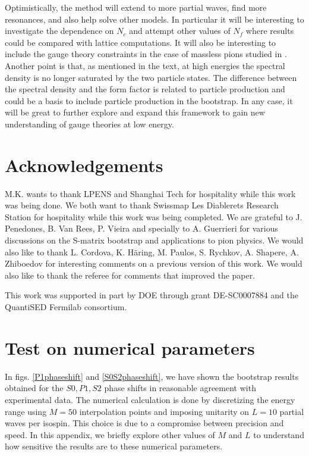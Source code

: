\documentclass[12pt,letterpaper]{article}
\begin{document}
     Optimistically, the method will extend to more partial waves, find more resonances, and also help solve other models. In particular it will be interesting to investigate the dependence on $N_c$ and attempt other values of $N_f$ where results could be compared with lattice computations.
     It will also be interesting to include the gauge theory constraints in the case of massless pions studied in \cite{Guerrieri:2020bto}.   
      Another point is that, as mentioned in the text, at high energies the spectral density is no longer saturated by the two particle states. The difference between the spectral density and the form factor is related to particle production and could be a basis to include particle production in the bootstrap. In any case, it will be great to further explore and expand this framework to gain new understanding of gauge theories at low energy.
	
\section{Acknowledgements}

 M.K. wants to thank LPENS and Shanghai Tech for hospitality while this work was being done. We both want to thank Swissmap Les Diablerets Research Station for hospitality while this work was being completed. We are grateful to J. Penedones, B. Van Rees, P. Vieira and specially to A. Guerrieri  for various discussions on the S-matrix bootstrap and applications to pion physics. We would also like to thank L. Cordova, K. H\"aring, M. Paulos, S. Rychkov, A. Shapere, A. Zhiboedov for interesting comments on a previous version of this work. We would also like to thank the referee for comments that improved the paper. 
 
 This work was supported in part by DOE through grant DE-SC0007884 and the QuantiSED Fermilab consortium.

 
\appendix


\section{Test on numerical parameters}

In figs. \ref{P1phaseshift} and \ref{S0S2phaseshift}, we have shown the bootstrap results obtained for the $S0,P1,S2$ phase shifts in reasonable agreement with experimental data. The numerical calculation is done by discretizing the energy range using $M=50$ interpolation points and imposing unitarity on $L=10$ partial waves per isospin. This choice is due to a compromise between precision and speed. In this appendix, we briefly explore other values of $M$ and $L$ to understand how sensitive the results are to these numerical parameters.    
\end{document}
